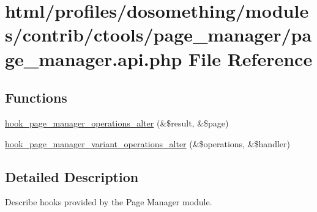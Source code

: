 \hypertarget{page__manager_8api_8php}{
\section{html/profiles/dosomething/modules/contrib/ctools/page\_\-manager/page\_\-manager.api.php File Reference}
\label{page__manager_8api_8php}
}
\subsection*{Functions}
\begin{DoxyCompactItemize}
\item 
\hyperlink{group__hooks_gadade57abdccc892f62ed6bc7f089ca29}{hook\_\-page\_\-manager\_\-operations\_\-alter} (\&\$result, \&\$page)
\item 
\hyperlink{group__hooks_gaf5d4ce054cae22b3bdca52011c6e8fbc}{hook\_\-page\_\-manager\_\-variant\_\-operations\_\-alter} (\&\$operations, \&\$handler)
\end{DoxyCompactItemize}


\subsection{Detailed Description}
Describe hooks provided by the Page Manager module. 